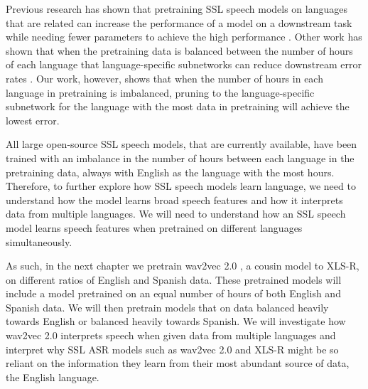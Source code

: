Previous research has shown that pretraining SSL speech models on languages that are related can increase the performance of a model on a downstream task while needing fewer parameters to achieve the high performance \cite{ashihara2023exploration, zhang2023fast}. Other work has shown that when the pretraining data is balanced between the number of hours of each language that language-specific subnetworks can reduce downstream error rates \cite{Lu_Language_adap_xlsr, yang2023learning}. Our work, however, shows that when the number of hours in each language in pretraining is imbalanced, pruning to the language-specific subnetwork for the language with the most data in pretraining will achieve the lowest error. 

All large open-source SSL speech models, that are currently available, have been trained with an imbalance in the number of hours between each language in the pretraining data, always with English as the language with the most hours. Therefore, to further explore how SSL speech models learn language, we need to understand how the model learns broad speech features and how it interprets data from multiple languages. We will need to understand how an SSL speech model learns speech features when pretrained on different languages simultaneously.

As such, in the next chapter we pretrain wav2vec 2.0 \cite{wav2vec}, a cousin model to XLS-R, on different ratios of English and Spanish data. These pretrained models will include a model pretrained on an equal number of hours of both English and Spanish data. We will then pretrain models that on data balanced heavily towards English or balanced heavily towards Spanish. We will investigate how wav2vec 2.0 interprets speech when given data from multiple languages and interpret why SSL ASR models such as wav2vec 2.0 and XLS-R might be so reliant on the information they learn from their most abundant source of data, the English language.






%
%
%